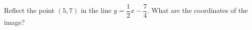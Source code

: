 Reflect the point $(5,7)$ in the line $y=\dfrac{1}{2}x-\dfrac{7}{4}$. What are the coordinates of the image?

